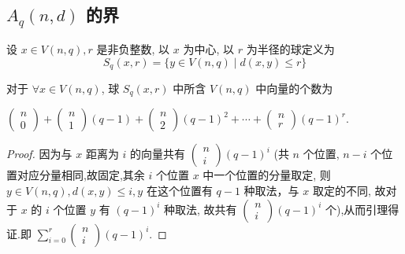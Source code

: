 \subsection{ $A_{q}(n, d) $ 的界}
\begin{definition}
    设 $ x \in V(n, q), r $ 是非负整数, 以 $ x $ 为中心, 以 $ r $ 为半径的球定义为
$$
S_{q}(x, r)=\{y \in V(n, q) \mid d(x, y) \leq r\}
$$
\end{definition}
\begin{lemma}
    对于 $ \forall x \in V(n, q) $, 球 $ S_{q}(x, r) $ 中所含 $ V(n, q) $ 中向量的个数为 
    
    $ \left(\begin{array}{c}n \\ 0\end{array}\right)+\left(\begin{array}{c}n \\ 1\end{array}\right)(q-1)+\left(\begin{array}{c}n \\ 2\end{array}\right)(q-1)^{2}+\cdots+\left(\begin{array}{c}n \\ r\end{array}\right)(q-1)^{r} $.
\end{lemma}
\begin{proof}
     因为与 $ x $ 距离为 $ i $ 的向量共有 $ \left(\begin{array}{c}n \\ i\end{array}\right)(q-1)^{i} $
(共 $ n $ 个位置, $ n-i $ 个位置对应分量相同,故固定,其余 $ i $ 个位置 $ x $ 中一个位置的分量取定, 则 $ y \in V(n, q), d(x, y) \leq i, y $ 在这个位置有 $ q-1 $ 种取法，与 $ x $ 取定的不同, 故对于 $ x $ 的 $ i $ 个位置 $ y $ 有 $ (q-1)^{i} $ 种取法, 故共有 $ \left(\begin{array}{c}n \\ i\end{array}\right)(q-1)^{i} $ 个),从而引理得证.即 $ \sum\limits_{i=0}^{r}\left(\begin{array}{c}n \\ i\end{array}\right)(q-1)^{i} $.
\end{proof}

